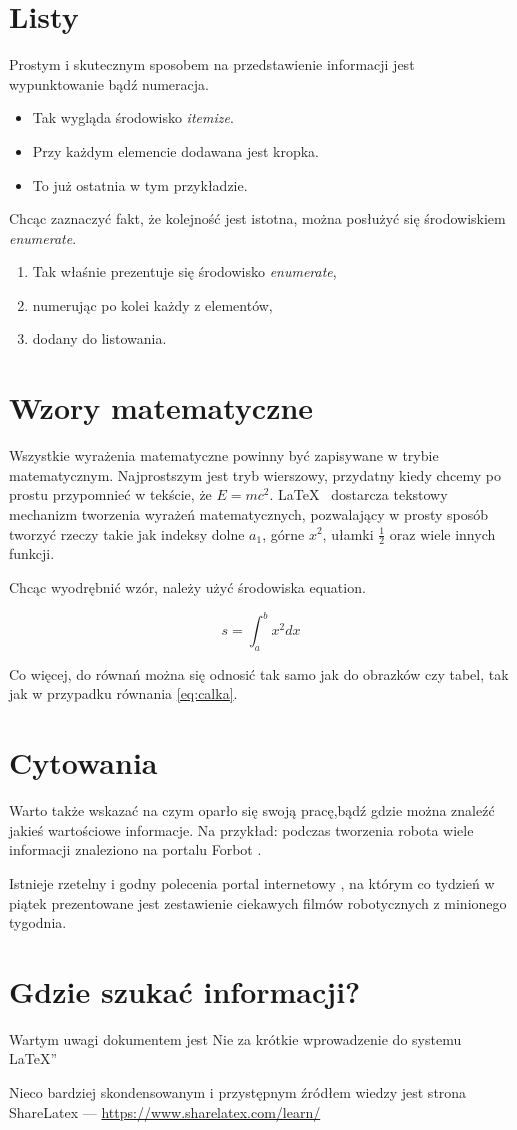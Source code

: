 \documentclass[12pt,a4paper]{article}
\begin{document}
\section{Listy}
%
Prostym i skutecznym sposobem na przedstawienie informacji jest wypunktowanie bądź numeracja.
%
\begin{itemize}
%
\item Tak wygląda środowisko \emph{itemize}.
%
\item Przy każdym elemencie dodawana jest kropka.
%
\item To już ostatnia w tym przykładzie.
%
\end{itemize}
%
Chcąc zaznaczyć fakt, że kolejność jest istotna, można posłużyć się środowiskiem \emph{enumerate}.
%
\begin{enumerate}
%
\item Tak właśnie prezentuje się środowisko \emph{enumerate},
%
\item numerując po kolei każdy z elementów,
%
\item dodany do listowania.
%
\end{enumerate}
%
\section{Wzory matematyczne}
Wszystkie wyrażenia matematyczne powinny być zapisywane w trybie matematycznym.
Najprostszym jest tryb wierszowy, przydatny kiedy chcemy po prostu przypomnieć w tekście, że $E=mc^2$. \LaTeX~ dostarcza tekstowy mechanizm tworzenia wyrażeń matematycznych, pozwalający w prosty sposób tworzyć rzeczy takie jak indeksy dolne $a_1$, górne $x^2$, ułamki $\frac{1}{2}$ oraz wiele innych funkcji. 

Chcąc wyodrębnić wzór, należy użyć środowiska equation.

\begin{equation}
\label{eq:calka}
s  = \int_{a}^{b} x^2 dx
\end{equation}

Co więcej, do równań można się odnosić tak samo jak do obrazków czy tabel, tak jak w przypadku równania \ref{eq:calka}.

\section{Cytowania}
Warto także wskazać na czym oparło się swoją pracę,bądź gdzie można znaleźć jakieś wartościowe informacje. Na przykład:
podczas tworzenia robota wiele informacji znaleziono na portalu Forbot \cite{forbot}.

Istnieje rzetelny i godny polecenia portal internetowy \cite{ieee}, na którym co tydzień w piątek prezentowane jest zestawienie ciekawych filmów robotycznych z minionego tygodnia.

\section{Gdzie szukać informacji?}
Wartym uwagi dokumentem jest \quotedblbase Nie za krótkie wprowadzenie do systemu \LaTeX\textquotedblright 

Nieco bardziej skondensowanym i przystępnym źródłem wiedzy jest strona ShareLatex ---
\href{https://www.sharelatex.com/learn/}{https://www.sharelatex.com/learn/}
\end{document}
